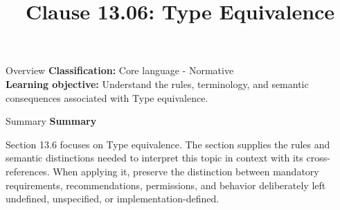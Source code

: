 \documentclass[10pt,letterpaper]{article}
\title{Clause 13.06: Type Equivalence}
\author{}
\date{}
\begin{document}
\maketitle
\begin{CornellOverviewBox}{Overview}
\textbf{Classification:} Core language - Normative\\[2pt]
\textbf{Learning objective:} Understand the rules, terminology, and semantic consequences associated with Type equivalence.
\end{CornellOverviewBox}\begin{CornellSummaryBox}{Summary}
{\sffamily\bfseries\color{Accent} Summary}\par\vspace{3pt}Section 13.6 focuses on Type equivalence. The section supplies the rules and semantic distinctions needed to interpret this topic in context with its cross-references. When applying it, preserve the distinction between mandatory requirements, recommendations, permissions, and behavior deliberately left undefined, unspecified, or implementation-defined.
\end{CornellSummaryBox}
\end{document}
